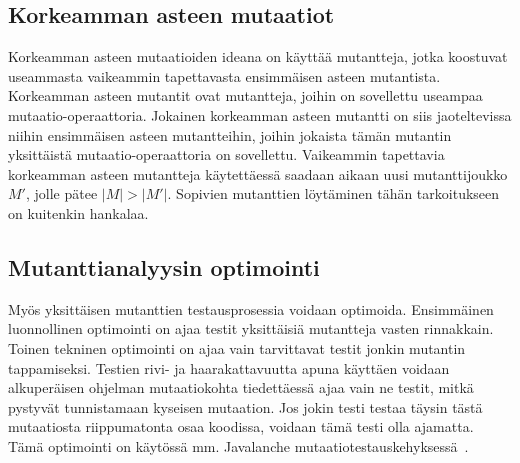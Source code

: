 \documentclass{tktltiki}
\begin{document}
\subsection{Korkeamman asteen mutaatiot}
Korkeamman asteen mutaatioiden ideana on käyttää mutantteja, jotka koostuvat useammasta vaikeammin tapettavasta ensimmäisen asteen mutantista. Korkeamman asteen mutantit ovat mutantteja, joihin on sovellettu useampaa mutaatio-operaattoria. Jokainen korkeamman asteen mutantti on siis jaoteltevissa niihin ensimmäisen asteen mutantteihin, joihin jokaista tämän mutantin yksittäistä mutaatio-operaattoria on sovellettu. Vaikeammin tapettavia korkeamman asteen mutantteja käytettäessä saadaan aikaan uusi mutanttijoukko $M'$, jolle pätee $|M| > |M'|$. Sopivien mutanttien löytäminen tähän tarkoitukseen on kuitenkin hankalaa. 

\subsection{Mutanttianalyysin optimointi}
Myös yksittäisen mutanttien testausprosessia voidaan optimoida. Ensimmäinen luonnollinen optimointi on ajaa testit yksittäisiä mutantteja vasten rinnakkain. Toinen tekninen optimointi on ajaa vain tarvittavat testit jonkin mutantin tappamiseksi. Testien rivi- ja haarakattavuutta apuna käyttäen voidaan alkuperäisen ohjelman mutaatiokohta tiedettäessä ajaa vain ne testit, mitkä pystyvät tunnistamaan kyseisen mutaation. Jos jokin testi testaa täysin tästä mutaatiosta riippumatonta osaa koodissa, voidaan tämä testi olla ajamatta. Tämä optimointi on käytössä mm. Javalanche mutaatiotestauskehyksessä~\cite{}.
\end{document}
